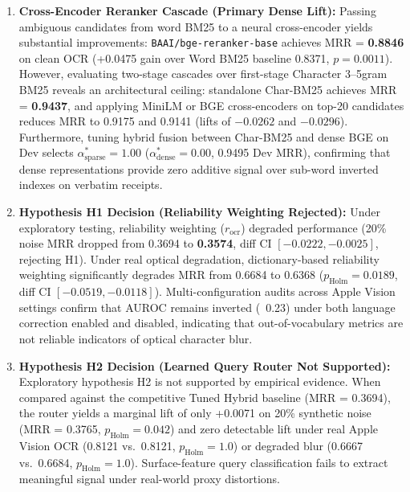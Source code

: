 \documentclass[conference]{IEEEtran}
\begin{document}
\begin{enumerate}
    \setlength{\itemsep}{0.2pt plus 0.1pt}
    \setlength{\parskip}{0pt}
    \item \textbf{Cross-Encoder Reranker Cascade (Primary Dense Lift):} Passing ambiguous candidates from word BM25 to a neural cross-encoder yields substantial improvements: \texttt{BAAI/bge-reranker-base} achieves MRR = \textbf{0.8846} on clean OCR (+0.0475 gain over Word BM25 baseline 0.8371, $p = 0.0011$). However, evaluating two-stage cascades over first-stage Character 3--5gram BM25 reveals an architectural ceiling: standalone Char-BM25 achieves MRR = \textbf{0.9437}, and applying MiniLM or BGE cross-encoders on top-20 candidates reduces MRR to 0.9175 and 0.9141 (lifts of $-0.0262$ and $-0.0296$). Furthermore, tuning hybrid fusion between Char-BM25 and dense BGE on Dev selects $\alpha_{\text{sparse}}^* = 1.00$ ($\alpha_{\text{dense}}^* = 0.00$, 0.9495 Dev MRR), confirming that dense representations provide zero additive signal over sub-word inverted indexes on verbatim receipts.
    \item \textbf{Hypothesis H1 Decision (Reliability Weighting Rejected):} Under exploratory testing, reliability weighting ($r_{\text{ocr}}$) degraded performance (20\% noise MRR dropped from 0.3694 to \textbf{0.3574}, diff CI $[-0.0222, -0.0025]$, rejecting H1). Under real optical degradation, dictionary-based reliability weighting significantly degrades MRR from 0.6684 to 0.6368 ($p_{\text{Holm}} = 0.0189$, diff CI $[-0.0519, -0.0118]$). Multi-configuration audits across Apple Vision settings confirm that AUROC remains inverted (~0.23) under both language correction enabled and disabled, indicating that out-of-vocabulary metrics are not reliable indicators of optical character blur.
    \item \textbf{Hypothesis H2 Decision (Learned Query Router Not Supported):} Exploratory hypothesis H2 is not supported by empirical evidence. When compared against the competitive Tuned Hybrid baseline (MRR = 0.3694), the router yields a marginal lift of only +0.0071 on 20\% synthetic noise (MRR = 0.3765, $p_{\text{Holm}} = 0.042$) and zero detectable lift under real Apple Vision OCR (0.8121 vs.\ 0.8121, $p_{\text{Holm}} = 1.0$) or degraded blur (0.6667 vs.\ 0.6684, $p_{\text{Holm}} = 1.0$). Surface-feature query classification fails to extract meaningful signal under real-world proxy distortions.
\end{enumerate}
\end{document}
